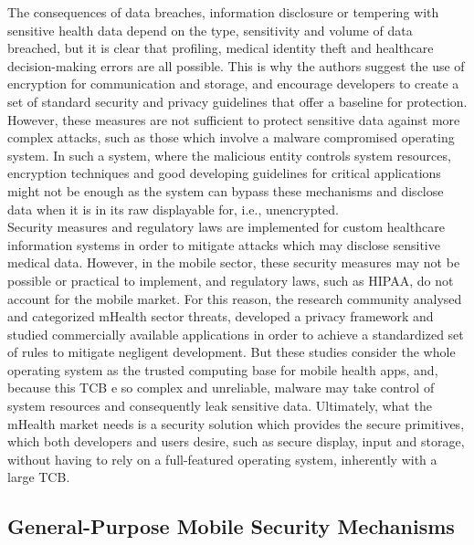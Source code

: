 The consequences of data breaches, information disclosure or tempering with sensitive health data depend on the type, sensitivity and volume of data breached, but it is clear that profiling, medical identity theft and healthcare decision-making errors are all possible. This is why the authors suggest the use of encryption for communication and storage, and encourage developers to create a set of standard security and privacy guidelines that offer a baseline for protection. However, these measures are not sufficient to protect sensitive data against more complex attacks, such as those which involve a malware compromised operating system. In such a system, where the malicious entity controls system resources, encryption techniques and good developing guidelines for critical applications might not be enough as the system can bypass these mechanisms and disclose data when it is in its raw displayable for, i.e., unencrypted.\\

Security measures and regulatory laws are implemented for custom healthcare information systems in order to mitigate attacks which may disclose sensitive medical data. However, in the mobile sector, these security measures may not be possible or practical to implement, and regulatory laws, such as \ac{HIPAA}, do not account for the mobile market. For this reason, the research community analysed and categorized mHealth sector threats, developed a privacy framework and studied commercially available applications in order to achieve a standardized set of rules to mitigate negligent development. But these studies consider the whole operating system as the trusted computing base for mobile health apps, and, because this \ac{TCB} e so complex and unreliable, malware may take control of system resources and consequently leak sensitive data. Ultimately, what the mHealth market needs is a security solution which provides the secure primitives, which both developers and users desire, such as secure display, input and storage, without having to rely on a full-featured operating system, inherently with a large \ac{TCB}.

\subsection{General-Purpose Mobile Security Mechanisms}


